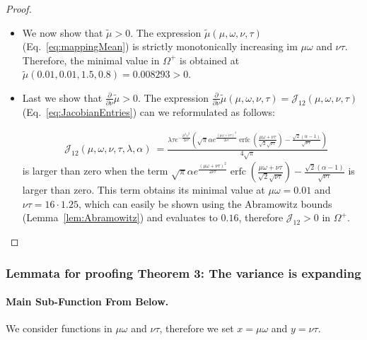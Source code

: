\documentclass{article}
\newcommand\munn{{\tilde \mu}}
\DeclareMathOperator{\erfc}{erfc}
\begin{document}
\begin{proof}
\begin{itemize}
\item We now show that $\munn > 0$. The expression
$\munn(\mu,\omega,\nu,\tau)$ (Eq.~\eqref{eq:mappingMean})
is strictly monotonically increasing im $\mu \omega$ and $\nu \tau$. Therefore,
the minimal value in $\Omega^+$ is obtained at 
$\munn(0.01,0.01,1.5,0.8)= 0.008293 > 0$. 

\item Last we show that $\frac{\partial}{\partial \nu} \munn > 0$.
The expression
$\frac{\partial}{\partial \nu}  \munn(\mu,\omega,\nu,\tau)={\mathcal J}_{12}(\mu,\omega,\nu,\tau)$ (Eq.~\eqref{eq:JacobianEntries})
can we reformulated as follows:

\begin{align}
&{\mathcal J}_{12}(\mu,\omega,\nu,\tau,\lambda ,\alpha ) \ =
\frac{\lambda  \tau  e^{-\frac{\mu ^2 \omega ^2}{2 \nu  \tau }} \left(\sqrt{\pi } \alpha  e^{\frac{(\mu  \omega +\nu  \tau )^2}{2 \nu  \tau }} 
\erfc \left(\frac{\mu  \omega +\nu  \tau }{\sqrt{2} \sqrt{\nu  \tau }}\right)-\frac{\sqrt{2} (\alpha -1)}{\sqrt{\nu  \tau }} \right)}{4 \sqrt{\pi } }
\end{align}
is larger than zero when the term $\sqrt{\pi } \alpha   e^{\frac{(\mu  \omega +\nu  \tau )^2}{2 \nu  \tau }} 
\erfc \left(\frac{\mu  \omega +\nu  \tau }{\sqrt{2} \sqrt{\nu  \tau }}\right)- \frac{\sqrt{2} (\alpha -1)}{\sqrt{\nu  \tau }}$
is larger than zero. This term obtains its minimal value 
at $\mu \omega = 0.01$ and $\nu \tau =16 \cdot 1.25$, which can easily be shown using the 
Abramowitz bounds (Lemma~\ref{lem:Abramowitz})
and evaluates to $0.16$, therefore ${\mathcal J}_{12} > 0$ in $\Omega^+$.

\end{itemize}
\end{proof}







\subsubsection{Lemmata for proofing Theorem 3: The variance is expanding}




\paragraph{Main Sub-Function From Below.}

We consider functions in
$\mu \omega$ and $\nu \tau$, therefore we 
set  $x=\mu \omega$ and $y=\nu \tau$.
\end{document}
